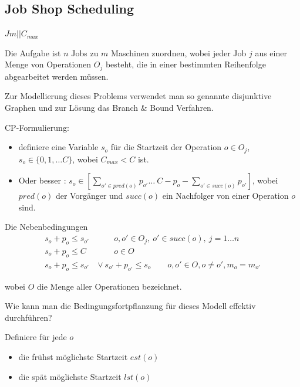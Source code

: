 \documentclass[hyperref={pdfpagelabels=false}]{beamer}
\begin{document}
\subsection{Job Shop Scheduling}
\begin{frame}[allowframebreaks]{$Jm||C_{max}$}
\nocite{CSP}
\small 

\vspace{40pt}
\begin{block}{}
Die Aufgabe ist $n$ Jobs zu $m$ Maschinen zuordnen, wobei jeder Job $j$ aus einer Menge von Operationen $O_j$ besteht, die in einer bestimmten Reihenfolge abgearbeitet werden müssen.
\end{block}

\begin{block}{}
Zur Modellierung dieses Problems verwendet man so genannte {\color{darkred}disjunktive Graphen} und
zur Lösung das {\color{darkred}Branch \& Bound} Verfahren.
\end{block}

\newpage

CP-Formulierung:
\begin{itemize}
\item definiere eine Variable $s_o$ für die Startzeit der Operation $o\in O_j$, $s_o\in \{0,1,\dots C\}$, wobei $C_{max}<C$ ist. 
\item Oder besser :  $s_o\in[\sum_{o'\in pred(o)}p_{o'}\dots\ C-p_o-\sum_{o'\in succ(o)}p_{o'}]$, wobei $pred(o)$ der Vorgänger und $succ(o)$ ein Nachfolger von einer Operation $o$ sind.
\end{itemize}

\begin{block}{Die Nebenbedingungen} \begin{align}
  s_o + p_o \le s_{o'} &\qquad  o,o'\in O_j,\ o'\in succ(o),\ j=1\dots n \nonumber \\
  s_o + p_o \le C &\qquad  o\in O \nonumber \\
  s_o + p_o \le s_{o'}\ & \vee\ s_{o'} + p_{o'} \le s_{o} \qquad o,o'\in O, o\not=o', m_o=m_{o'} \nonumber 
\end{align}
\end{block}
wobei $O$ die Menge aller Operationen bezeichnet.


\newpage

Wie kann man die Bedingungsfortpflanzung für dieses Modell effektiv durchführen? 

Definiere für jede $o$ 
\begin{itemize}
\item die frühst möglichste Startzeit $est(o)$
\item die spät möglichste Startzeit $lst(o)$
\end{itemize}


\end{frame}
\end{document}
